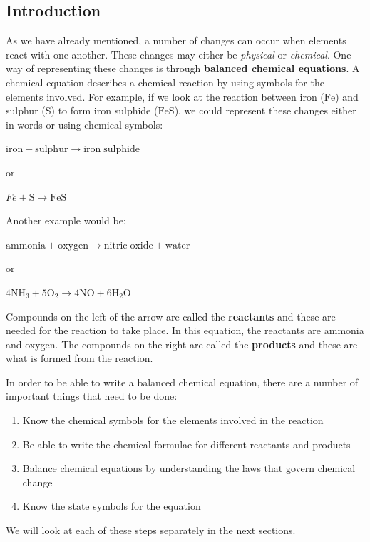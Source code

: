             \subsection{ Introduction}
            \nopagebreak
      \label{m38721*id62175}As we have already mentioned, a number of changes can occur when elements react with one another. These changes may either be \textsl{physical} or \textsl{chemical}. One way of representing these changes is through \textbf{balanced chemical equations}. A chemical equation describes a chemical reaction by using symbols for the elements involved. For example, if we look at the reaction between iron ($\mathrm{Fe}$) and sulphur ($\mathrm{S}$) to form iron sulphide ($\mathrm{FeS}$), we could represent these changes either in words or using chemical symbols:\par 
      \label{m38721*id62197}$\mathrm{iron}+\mathrm{sulphur}\to \mathrm{iron\; sulphide}$\par 
      \label{m38721*id62550}or\par 
      \label{m38721*id62555}
        $Fe+\mathrm{S}\to \mathrm{FeS}$
      \par 
      \label{m38721*id62582}Another example would be:\par 
      \label{m38721*id62585}$\mathrm{ammonia}+\mathrm{oxygen}\to \mathrm{nitric\; oxide}+\mathrm{water}$\par 
      \label{m38721*id62598}or\par 
      \label{m38721*id62603}$4{\mathrm{NH}}_{3}+5{\mathrm{O}}_{2}\to 4\mathrm{NO}+6{\mathrm{H}}_{2}\mathrm{O}$
      \par 
      \label{m38721*id62659}Compounds on the left of the arrow are called the \textbf{reactants} and these are needed for the reaction to take place. In this equation, the reactants are ammonia and oxygen. The compounds on the right are called the \textbf{products} and these are what is formed from the reaction.\par 
      \label{m38721*id62675}In order to be able to write a balanced chemical equation, there are a number of important things that need to be done:\par 
      \label{m38721*id62681}\begin{enumerate}[noitemsep, label=\textbf{\arabic*}. ] 
            \label{m38721*uid1}\item Know the chemical symbols for the elements involved in the reaction
\label{m38721*uid2}\item Be able to write the chemical formulae for different reactants and products
\label{m38721*uid3}\item Balance chemical equations by understanding the laws that govern chemical change
\label{m38721*uid4}\item Know the state symbols for the equation
\end{enumerate}
      \label{m38721*id62733}We will look at each of these steps separately in the next sections.\par 
    \label{m38721*cid2}
